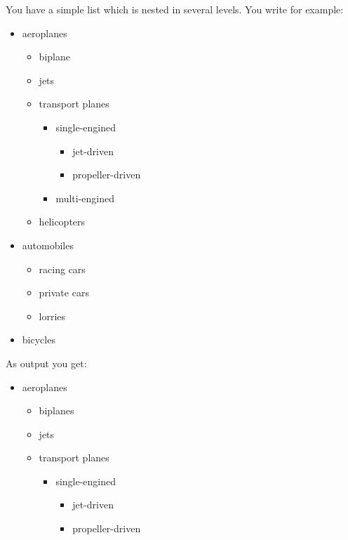 \begin{Example}
  \label{desc:maincls.env.itemize.example}%
  You have a simple list which is nested in several levels. You write
  for example:
\begin{lstcode}
  \begin{itemize}
    \item aeroplanes
    \begin{itemize}
      \item biplane
      \item jets
      \item transport planes
      \begin{itemize}
        \item single-engined
        \begin{itemize}
          \item jet-driven
          \item propeller-driven
        \end{itemize}
        \item multi-engined
      \end{itemize}
      \item helicopters
    \end{itemize}
    \item automobiles
    \begin{itemize}
      \item racing cars
      \item private cars
      \item lorries
    \end{itemize}
    \item bicycles
  \end{itemize}
\end{lstcode}
  As output you get:
  \begin{ShowOutput}[\baselineskip]
  \begin{itemize}
    \item aeroplanes
    \begin{itemize}
      \item biplanes
      \item jets
      \item transport planes
      \begin{itemize}
        \item single-engined
        \begin{itemize}
          \item jet-driven
          \item propeller-driven

\end{itemize}
\end{itemize}
\end{itemize}
\end{itemize}
\end{ShowOutput}
\end{Example}
